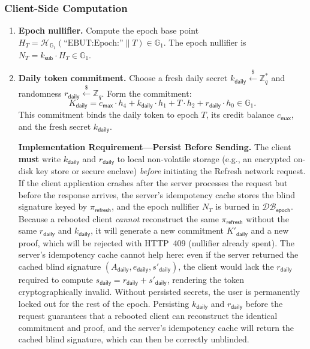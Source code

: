\documentclass[11pt]{article}
\theoremstyle{definitionstyle}
\theoremstyle{plain}
\newcommand{\DB}{\mathcal{DB}}
\begin{document}
\subsubsection{Client-Side Computation}
\begin{enumerate}[leftmargin=*]
\item \textbf{Epoch nullifier.}
  Compute the epoch base point $H_T = \mathcal{H}_{\mathbb{G}_1}(\text{``EBUT:Epoch:''} \parallel T) \in \mathbb{G}_1$.
  The epoch nullifier is $N_T = k_{\mathsf{sub}} \cdot H_T \in \mathbb{G}_1$.
\item \textbf{Daily token commitment.}
  Choose a fresh daily secret $k_{\mathsf{daily}} \xleftarrow{\$} \mathbb{Z}_q^*$ and randomness $r_{\mathsf{daily}} \xleftarrow{\$} \mathbb{Z}_q$. Form the commitment:
  \[
  K_{\mathsf{daily}} = c_{\mathsf{max}} \cdot h_4 + k_{\mathsf{daily}} \cdot h_1 + T \cdot h_2 + r_{\mathsf{daily}} \cdot h_0 \in \mathbb{G}_1.
  \]
  This commitment binds the daily token to epoch $T$, its credit balance $c_{\mathsf{max}}$, and the fresh secret $k_{\mathsf{daily}}$.

  \textbf{Implementation Requirement---Persist Before Sending.}
  The client \textbf{must} write $k_{\mathsf{daily}}$ and $r_{\mathsf{daily}}$ to local non-volatile storage (e.g., an encrypted on-disk key store or secure enclave) \emph{before} initiating the Refresh network request. If the client application crashes after the server processes the request but before the response arrives, the server's idempotency cache stores the blind signature keyed by $\pi_{\mathsf{refresh}}$, and the epoch nullifier $N_T$ is burned in $\DB_{\mathsf{epoch}}$. Because a rebooted client \emph{cannot} reconstruct the same $\pi_{\mathsf{refresh}}$ without the same $r_{\mathsf{daily}}$ and $k_{\mathsf{daily}}$, it will generate a new commitment $K'_{\mathsf{daily}}$ and a new proof, which will be rejected with HTTP~409 (nullifier already spent). The server's idempotency cache cannot help here: even if the server returned the cached blind signature $(A_{\mathsf{daily}}, e_{\mathsf{daily}}, s'_{\mathsf{daily}})$, the client would lack the $r_{\mathsf{daily}}$ required to compute $s_{\mathsf{daily}} = r_{\mathsf{daily}} + s'_{\mathsf{daily}}$, rendering the token cryptographically invalid. Without persisted secrets, the user is permanently locked out for the rest of the epoch. Persisting $k_{\mathsf{daily}}$ and $r_{\mathsf{daily}}$ before the request guarantees that a rebooted client can reconstruct the identical commitment and proof, and the server's idempotency cache will return the cached blind signature, which can then be correctly unblinded.


\end{enumerate}
\end{document}
